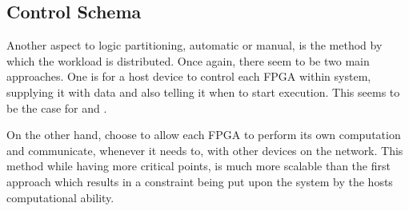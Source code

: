 \subsection{Control Schema}

Another aspect to logic partitioning, automatic or manual, is the method by which the workload is distributed. Once again, there seem to be two main approaches. One is for a host device to control each FPGA within system, supplying it with data and also telling it when to start execution. This seems to be the case for \cite{707888} and \cite{10.1145/3337821.3337846}.

On the other hand, \cite{10.1145/3020078.3021739, 10.1145/3358192, soton261305} choose to allow each FPGA to perform its own computation and communicate, whenever it needs to, with other devices on the network. This method while having more critical points, is much more scalable than the first approach which results in a constraint being put upon the system by the hosts computational ability.